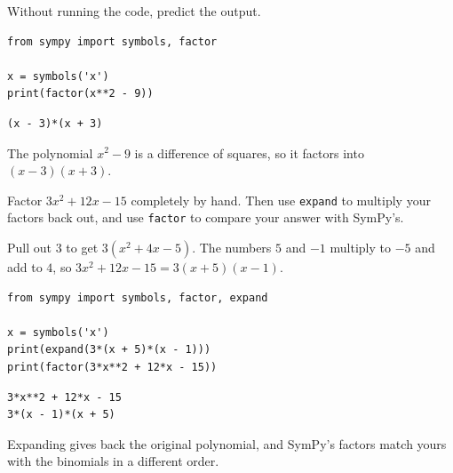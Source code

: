 \begin{Exercise}[title={Predict what SymPy prints}, label={ex:factoring_polynomials-python-5}]
Without running the code, predict the output.
\begin{verbatim}
from sympy import symbols, factor

x = symbols('x')
print(factor(x**2 - 9))
\end{verbatim}
\end{Exercise}
\begin{Answer}[ref={ex:factoring_polynomials-python-5}]
\begin{verbatim}
(x - 3)*(x + 3)
\end{verbatim}
The polynomial $x^2 - 9$ is a difference of squares, so it factors into
$(x - 3)(x + 3)$.
\end{Answer}

\begin{Exercise}[title={Factor by hand, then check with SymPy}, label={ex:factoring_polynomials-python-6}]
Factor $3x^2 + 12x - 15$ completely by hand. Then use
\texttt{expand} to multiply your factors back out, and use
\texttt{factor} to compare your answer with SymPy's.
\end{Exercise}
\begin{Answer}[ref={ex:factoring_polynomials-python-6}]
Pull out 3 to get $3(x^2 + 4x - 5)$. The numbers $5$ and $-1$ multiply
to $-5$ and add to $4$, so $3x^2 + 12x - 15 = 3(x + 5)(x - 1)$.
\begin{verbatim}
from sympy import symbols, factor, expand

x = symbols('x')
print(expand(3*(x + 5)*(x - 1)))
print(factor(3*x**2 + 12*x - 15))
\end{verbatim}
\begin{verbatim}
3*x**2 + 12*x - 15
3*(x - 1)*(x + 5)
\end{verbatim}
Expanding gives back the original polynomial, and SymPy's factors match
yours with the binomials in a different order.
\end{Answer}

